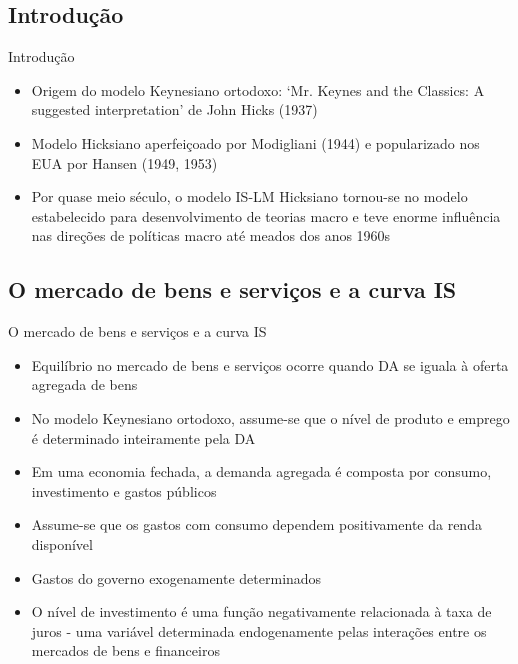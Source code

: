 \documentclass[10pt]{beamer}
\begin{document}
\subsection{Introdução}
\begin{frame}{Introdução}
    \begin{itemize}
        \item Origem do modelo Keynesiano ortodoxo: `Mr. Keynes and the Classics: A suggested interpretation' de John Hicks (1937)
        \bigskip
        \item Modelo Hicksiano aperfeiçoado por Modigliani (1944) e popularizado nos EUA por Hansen (1949, 1953)
        \bigskip
        \item Por quase meio século, o modelo IS-LM Hicksiano tornou-se no modelo estabelecido para desenvolvimento de teorias macro e teve enorme influência nas direções de políticas macro até meados dos anos 1960s
    \end{itemize}
\end{frame}

\subsection{O mercado de bens e serviços e a curva IS}
\begin{frame}{O mercado de bens e serviços e a curva IS}
    \begin{itemize}
        \item Equilíbrio no mercado de bens e serviços ocorre quando DA se iguala à oferta agregada de bens
        \bigskip
        \item No modelo Keynesiano ortodoxo, assume-se que o nível de produto e emprego é determinado inteiramente pela DA
        \bigskip
        \item Em uma economia fechada, a demanda agregada é composta por consumo, investimento e gastos públicos
        \bigskip
        \item Assume-se que os gastos com consumo dependem positivamente da renda disponível
        \bigskip
        \item Gastos do governo exogenamente determinados
        \bigskip
        \item O nível de investimento é uma função negativamente relacionada à taxa de juros - uma variável determinada endogenamente pelas interações entre os mercados de bens e financeiros
    \end{itemize}
\end{frame}
\end{document}
